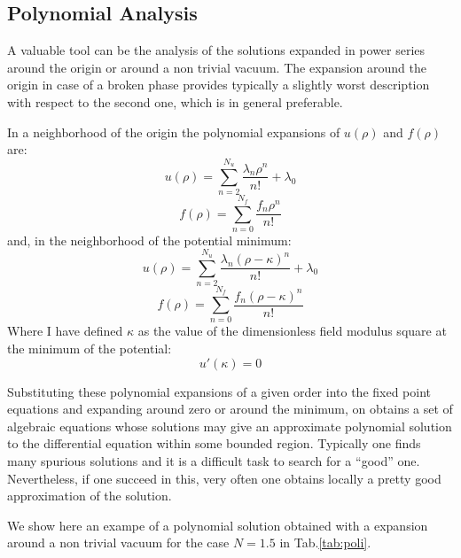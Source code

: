 \newpage 
\subsection{Polynomial Analysis}
A valuable tool can be the analysis of the solutions expanded in power series around the origin or around a non trivial vacuum.
The expansion around the origin in case of a broken phase provides typically a slightly worst description with respect to the second one, which is in general preferable.

In a neighborhood of the origin  the  polynomial expansions of $u(\rho)$ and $f(\rho)$ are:
\begin{equation}
 u(\rho) = \sum _{n=2}^{N_u} \frac{\lambda _n \rho^n}{n!}+\lambda _0
\end{equation}\begin{equation}
 f(\rho) = \sum _{n=0}^{N_f} \frac{f_n \rho^n}{n!}
\end{equation}
and, in the neighborhood of the potential minimum:
\begin{equation}
 u(\rho) = \sum _{n=2}^{N_u} \frac{\lambda _n (\rho -\kappa )^n}{n!}+\lambda _0
\end{equation}\begin{equation}
 f(\rho) = \sum _{n=0}^{N_f} \frac{f_n (\rho -\kappa )^n}{n!}
\end{equation}
Where I have defined $\kappa$ as the value of the dimensionless field modulus square at the minimum of the potential:
\begin{equation}
u'(\kappa) = 0
\end{equation}


Substituting these polynomial expansions of a given order into the fixed point equations and expanding around zero or around the minimum, on obtains a set of algebraic equations whose solutions may give an approximate 
polynomial solution to the differential equation within some bounded region.
Typically one finds many spurious solutions and it is a difficult task to search for a ``good'' one. Nevertheless, if one succeed in this, very often one obtains locally a pretty good approximation of the solution.

We show here an exampe of a polynomial solution obtained with a expansion around a non trivial vacuum for the case $N=1.5$ in Tab.\ref{tab:poli}.

